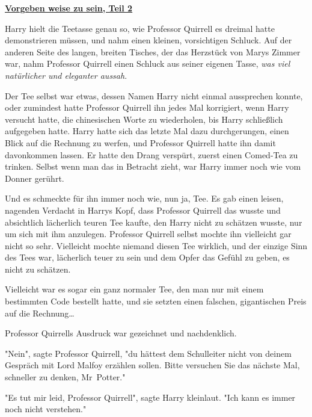 

\hypertarget{vorgeben-weise-zu-sein-teil-2}{%

\textbf{\uline{Vorgeben weise zu sein, Teil 2}}

Harry hielt die Teetasse genau so, wie Professor Quirrell es dreimal hatte demonstrieren müssen, und nahm einen kleinen, vorsichtigen Schluck. Auf der anderen Seite des langen, breiten Tisches, der das Herzstück von Marys Zimmer war, nahm Professor Quirrell einen Schluck aus seiner eigenen Tasse, \emph{was viel natürlicher und eleganter aussah}.

Der Tee selbst war etwas, dessen Namen Harry nicht einmal aussprechen konnte, oder zumindest hatte Professor Quirrell ihn jedes Mal korrigiert, wenn Harry versucht hatte, die chinesischen Worte zu wiederholen, bis Harry schließlich aufgegeben hatte. Harry hatte sich das letzte Mal dazu durchgerungen, einen Blick auf die Rechnung zu werfen, und Professor Quirrell hatte ihn damit davonkommen lassen. Er hatte den Drang verspürt, zuerst einen Comed-Tea zu trinken. Selbst wenn man das in Betracht zieht, war Harry immer noch wie vom Donner gerührt.

Und es schmeckte für ihn immer noch wie, nun ja, Tee. Es gab einen leisen, nagenden Verdacht in Harrys Kopf, dass Professor Quirrell das wusste und absichtlich lächerlich teuren Tee kaufte, den Harry nicht zu schätzen wusste, nur um sich mit ihm anzulegen. Professor Quirrell selbst mochte ihn vielleicht gar nicht so sehr. Vielleicht mochte niemand diesen Tee wirklich, und der einzige Sinn des Tees war, lächerlich teuer zu sein und dem Opfer das Gefühl zu geben, es nicht zu schätzen.

Vielleicht war es sogar ein ganz normaler Tee, den man nur mit einem bestimmten Code bestellt hatte, und sie setzten einen falschen, gigantischen Preis auf die Rechnung…

Professor Quirrells Ausdruck war gezeichnet und nachdenklich.

"Nein", sagte Professor Quirrell, "du hättest dem Schulleiter nicht von deinem Gespräch mit Lord Malfoy erzählen sollen. Bitte versuchen Sie das nächste Mal, schneller zu denken, Mr~Potter."

"Es tut mir leid, Professor Quirrell", sagte Harry kleinlaut. "Ich kann es immer noch nicht verstehen."

}

